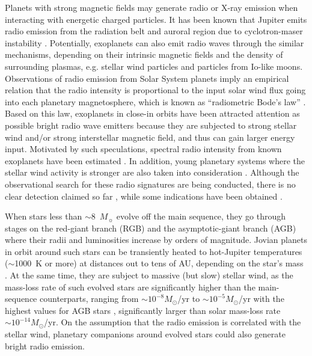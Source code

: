 \documentclass{emulateapj}
\def\memoYF#1{\color{red}$[${\bf #1}$]$ \color{black}}
\begin{document}
Planets with strong magnetic fields may generate radio or X-ray emission when interacting with energetic charged particles. 
It has been known that Jupiter emits radio emission from the radiation belt and auroral region due to cyclotron-maser instability \citep{zarka1998}.  %
Potentially, exoplanets can also emit radio waves through the similar mechanisms, depending on their intrinsic magnetic fields and the density of surrounding plasmas, e.g. stellar wind particles and particles from Io-like moons. 
Observations of radio emission from Solar System planets imply an empirical relation that the radio intensity is proportional to the input solar wind flux going into each planetary magnetosphere, which is known as  ``radiometric Bode's law'' \citep{desch+kaiser1984}. 
Based on this law, exoplanets in close-in orbits have been attracted attention as possible bright radio wave emitters because they are subjected to strong stellar wind and/or strong interstellar magnetic field, and thus can gain larger energy input. Motivated by such speculations, spectral radio intensity from known exoplanets have been estimated  \citep{farrell1999,zarka2001,Lazio2004,griesmeier2004,griesmeier2007a,griesmeier2007b,reiners2010}. 
In addition, young planetary systems where the stellar wind activity is stronger are also taken into consideration \citep{griesmeier2005}. 
Although the observational search for these radio signatures are being conducted, there is no clear detection claimed so far
\citep{bastian2000,george2007,stroe2012,hallinan2013,murphy2015}, 
while some indications have been obtained \citep{lecavelier_et_al2013,sirothia2014}. 

When stars less than $\sim$8~$M_\sun$ evolve off the main sequence,
they go through stages on the red-giant branch (RGB) and the
asymptotic-giant branch (AGB) where their radii and luminosities increase by orders of magnitude. 
Jovian planets in orbit around such stars can be transiently heated to hot-Jupiter temperatures ($\sim$1000~K or more) at distances out to tens of AU, depending on the star's mass \citep{spiegel+madhusudhan2012}. 
At the same time, they are subject to massive (but slow) stellar wind, as the mass-loss rate of such evolved stars are significantly higher than the main-sequence counterparts, ranging from $\sim  10^{-8} M_\odot$/yr to $\sim  10^{-5} M_\odot$/yr with the highest values for AGB stars \citep[e.g.,][]{reimers1975, schild1989, vassiliadis1993, schoier2001, vanloon2005}, significantly larger than solar mass-loss rate $\sim 10^{-14}M_\odot$/yr. 
On the assumption that the radio emission is correlated with the stellar wind, planetary companions around evolved stars could also generate bright radio emission. 
\end{document}
